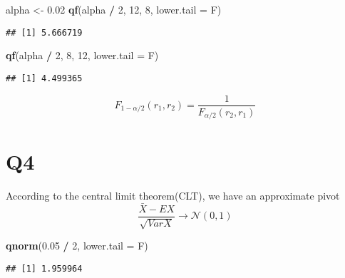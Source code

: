 \documentclass[
]{book}
\newenvironment{Shaded}{\begin{snugshade}}{\end{snugshade}}
\newcommand{\DataTypeTok}[1]{\textcolor[rgb]{0.13,0.29,0.53}{#1}}
\newcommand{\DecValTok}[1]{\textcolor[rgb]{0.00,0.00,0.81}{#1}}
\newcommand{\FloatTok}[1]{\textcolor[rgb]{0.00,0.00,0.81}{#1}}
\newcommand{\KeywordTok}[1]{\textcolor[rgb]{0.13,0.29,0.53}{\textbf{#1}}}
\newcommand{\NormalTok}[1]{#1}
\newcommand{\OperatorTok}[1]{\textcolor[rgb]{0.81,0.36,0.00}{\textbf{#1}}}
\newcommand{\StringTok}[1]{\textcolor[rgb]{0.31,0.60,0.02}{#1}}
\theoremstyle{definition}
\theoremstyle{definition}
\theoremstyle{definition}
\theoremstyle{remark}
\begin{document}
\begin{Shaded}
\begin{Highlighting}[]
\NormalTok{alpha <-}\StringTok{ }\FloatTok{0.02}
\KeywordTok{qf}\NormalTok{(alpha }\OperatorTok{/}\StringTok{ }\DecValTok{2}\NormalTok{, }\DecValTok{12}\NormalTok{, }\DecValTok{8}\NormalTok{, }\DataTypeTok{lower.tail =}\NormalTok{ F)}
\end{Highlighting}
\end{Shaded}

\begin{verbatim}
## [1] 5.666719
\end{verbatim}

\begin{Shaded}
\begin{Highlighting}[]
\KeywordTok{qf}\NormalTok{(alpha }\OperatorTok{/}\StringTok{ }\DecValTok{2}\NormalTok{, }\DecValTok{8}\NormalTok{, }\DecValTok{12}\NormalTok{, }\DataTypeTok{lower.tail =}\NormalTok{ F)}
\end{Highlighting}
\end{Shaded}

\begin{verbatim}
## [1] 4.499365
\end{verbatim}

\begin{equation}
F_{1-\alpha / 2}(r_1, r_2) = \frac{1}{F_{\alpha / 2}(r_2, r_1)}
\end{equation}

\hypertarget{q4-1}{%
\section{Q4}\label{q4-1}}

According to the central limit theorem(CLT), we have an approximate pivot
\begin{equation}
\frac{\bar X - EX}{\sqrt{Var X}}\rightarrow \mathcal{N}(0,1)
\end{equation}

\begin{Shaded}
\begin{Highlighting}[]
\KeywordTok{qnorm}\NormalTok{(}\FloatTok{0.05} \OperatorTok{/}\StringTok{ }\DecValTok{2}\NormalTok{, }\DataTypeTok{lower.tail =}\NormalTok{ F)}
\end{Highlighting}
\end{Shaded}

\begin{verbatim}
## [1] 1.959964
\end{verbatim}
\end{document}
